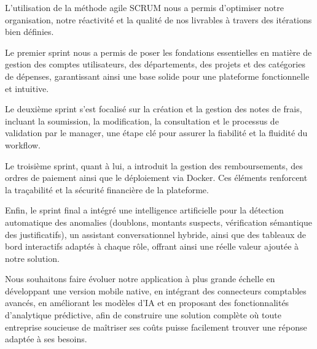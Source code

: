 \documentclass[12pt,a4paper]{report}
\begin{document}
L'utilisation de la méthode agile SCRUM nous a permis d'optimiser notre organisation, notre réactivité et la qualité de nos livrables à travers des itérations bien définies.



Le premier sprint nous a permis de poser les fondations essentielles en matière de gestion des comptes utilisateurs, des départements, des projets et des catégories de dépenses, garantissant ainsi une base solide pour une plateforme fonctionnelle et intuitive.



Le deuxième sprint s'est focalisé sur la création et la gestion des notes de frais, incluant la soumission, la modification, la consultation et le processus de validation par le manager, une étape clé pour assurer la fiabilité et la fluidité du workflow.



Le troisième sprint, quant à lui, a introduit la gestion des remboursements, des ordres de paiement ainsi que le déploiement via Docker. Ces éléments renforcent la traçabilité et la sécurité financière de la plateforme.



Enfin, le sprint final a intégré une intelligence artificielle pour la détection automatique des anomalies (doublons, montants suspects, vérification sémantique des justificatifs), un assistant conversationnel hybride, ainsi que des tableaux de bord interactifs adaptés à chaque rôle, offrant ainsi une réelle valeur ajoutée à notre solution.



Nous souhaitons faire évoluer notre application à plus grande échelle en développant une version mobile native, en intégrant des connecteurs comptables avancés, en améliorant les modèles d'IA et en proposant des fonctionnalités d'analytique prédictive, afin de construire une solution complète où toute entreprise soucieuse de maîtriser ses coûts puisse facilement trouver une réponse adaptée à ses besoins.


\end{document}
